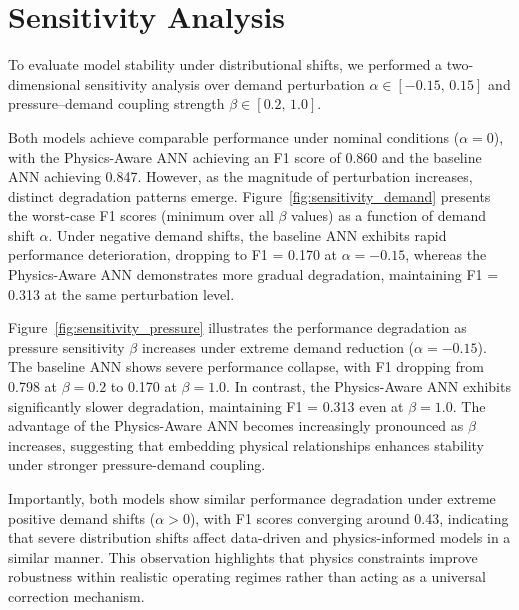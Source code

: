\documentclass[final,5p,times,twocolumn,authoryear]{elsarticle}
\begin{document}
\section{Sensitivity Analysis}

To evaluate model stability under distributional shifts, we performed a two-dimensional sensitivity analysis over demand perturbation $\alpha \in [-0.15,\, 0.15]$ and pressure--demand coupling strength $\beta \in [0.2,\, 1.0]$.

Both models achieve comparable performance under nominal conditions ($\alpha = 0$), with the Physics-Aware ANN achieving an F1 score of 0.860 and the baseline ANN achieving 0.847. However, as the magnitude of perturbation increases, distinct degradation patterns emerge. Figure~\ref{fig:sensitivity_demand} presents the worst-case F1 scores (minimum over all $\beta$ values) as a function of demand shift $\alpha$. Under negative demand shifts, the baseline ANN exhibits rapid performance deterioration, dropping to F1 = 0.170 at $\alpha = -0.15$, whereas the Physics-Aware ANN demonstrates more gradual degradation, maintaining F1 = 0.313 at the same perturbation level.

Figure~\ref{fig:sensitivity_pressure} illustrates the performance degradation as pressure sensitivity $\beta$ increases under extreme demand reduction ($\alpha = -0.15$). The baseline ANN shows severe performance collapse, with F1 dropping from 0.798 at $\beta = 0.2$ to 0.170 at $\beta = 1.0$. In contrast, the Physics-Aware ANN exhibits significantly slower degradation, maintaining F1 = 0.313 even at $\beta = 1.0$. The advantage of the Physics-Aware ANN becomes increasingly pronounced as $\beta$ increases, suggesting that embedding physical relationships enhances stability under stronger pressure-demand coupling.

Importantly, both models show similar performance degradation under extreme positive demand shifts ($\alpha > 0$), with F1 scores converging around 0.43, indicating that severe distribution shifts affect data-driven and physics-informed models in a similar manner. This observation highlights that physics constraints improve robustness within realistic operating regimes rather than acting as a universal correction mechanism.
\end{document}
